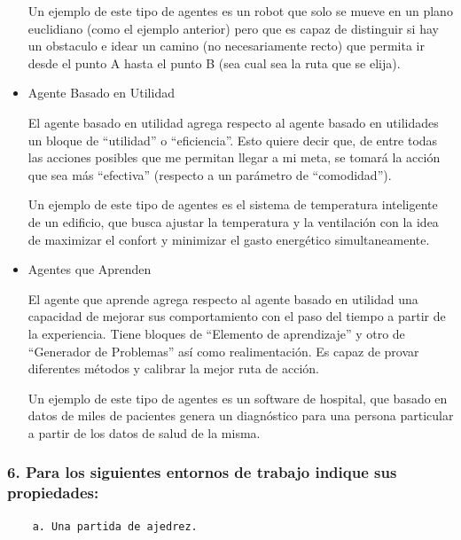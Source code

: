 \documentclass[11pt]{article}
\begin{document}
\begin{itemize}
  Un ejemplo de este tipo de agentes es un robot que solo se mueve en un
  plano euclidiano (como el ejemplo anterior) pero que es capaz de
  distinguir si hay un obstaculo e idear un camino (no necesariamente
  recto) que permita ir desde el punto A hasta el punto B (sea cual sea
  la ruta que se elija).
\item
  Agente Basado en Utilidad

  El agente basado en utilidad agrega respecto al agente basado en
  utilidades un bloque de ``utilidad'' o ``eficiencia''. Esto quiere
  decir que, de entre todas las acciones posibles que me permitan llegar
  a mi meta, se tomará la acción que sea más ``efectiva'' (respecto a un
  parámetro de ``comodidad'').

  Un ejemplo de este tipo de agentes es el sistema de temperatura
  inteligente de un edificio, que busca ajustar la temperatura y la
  ventilación con la idea de maximizar el confort y minimizar el gasto
  energético simultaneamente.
\item
  Agentes que Aprenden

  El agente que aprende agrega respecto al agente basado en utilidad una
  capacidad de mejorar sus comportamiento con el paso del tiempo a
  partir de la experiencia. Tiene bloques de ``Elemento de aprendizaje''
  y otro de ``Generador de Problemas'' así como realimentación. Es capaz
  de provar diferentes métodos y calibrar la mejor ruta de acción.

  Un ejemplo de este tipo de agentes es un software de hospital, que
  basado en datos de miles de pacientes genera un diagnóstico para una
  persona particular a partir de los datos de salud de la misma.
\end{itemize}

    \subsubsection{\texorpdfstring{6. Para los siguientes entornos de
trabajo indique sus
\textbf{propiedades}:}{6. Para los siguientes entornos de trabajo indique sus propiedades:}}\label{para-los-siguientes-entornos-de-trabajo-indique-sus-propiedades}

\begin{verbatim}
    a. Una partida de ajedrez.
\end{verbatim}
\end{document}
